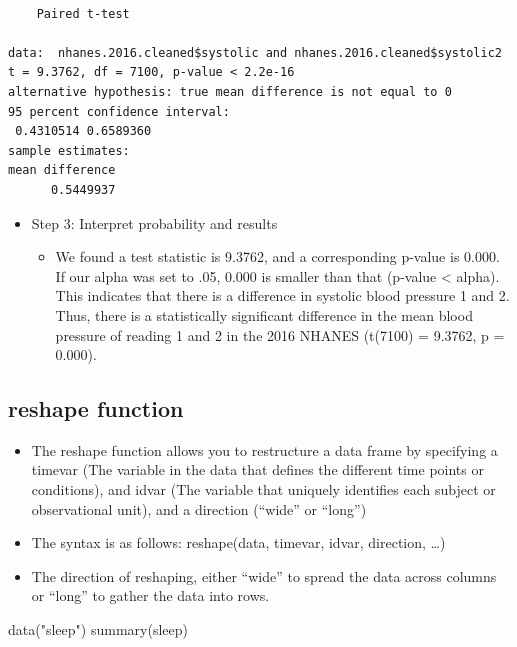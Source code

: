 \documentclass[
  letterpaper,
  DIV=11,
  numbers=noendperiod]{scrreprt}
\newenvironment{Shaded}{\begin{snugshade}}{\end{snugshade}}
\newcommand{\FunctionTok}[1]{\textcolor[rgb]{0.28,0.35,0.67}{#1}}
\newcommand{\NormalTok}[1]{\textcolor[rgb]{0.00,0.23,0.31}{#1}}
\newcommand{\StringTok}[1]{\textcolor[rgb]{0.13,0.47,0.30}{#1}}
\providecommand{\tightlist}{%
  \setlength{\itemsep}{0pt}\setlength{\parskip}{0pt}}\usepackage{longtable,booktabs,array}
\begin{document}
\begin{verbatim}

    Paired t-test

data:  nhanes.2016.cleaned$systolic and nhanes.2016.cleaned$systolic2
t = 9.3762, df = 7100, p-value < 2.2e-16
alternative hypothesis: true mean difference is not equal to 0
95 percent confidence interval:
 0.4310514 0.6589360
sample estimates:
mean difference 
      0.5449937 
\end{verbatim}

\begin{itemize}
\tightlist
\item
  Step 3: Interpret probability and results

  \begin{itemize}
  \tightlist
  \item
    We found a test statistic is 9.3762, and a corresponding p-value is
    0.000. If our alpha was set to .05, 0.000 is smaller than that
    (p-value \textless{} alpha). This indicates that there is a
    difference in systolic blood pressure 1 and 2. Thus, there is a
    statistically significant difference in the mean blood pressure of
    reading 1 and 2 in the 2016 NHANES (t(7100) = 9.3762, p = 0.000).
  \end{itemize}
\end{itemize}

\subsection{reshape function}\label{reshape-function}

\begin{itemize}
\tightlist
\item
  The reshape function allows you to restructure a data frame by
  specifying a timevar (The variable in the data that defines the
  different time points or conditions), and idvar (The variable that
  uniquely identifies each subject or observational unit), and a
  direction (``wide'' or ``long'')
\item
  The syntax is as follows: reshape(data, timevar, idvar, direction,
  \ldots)
\item
  The direction of reshaping, either ``wide'' to spread the data across
  columns or ``long'' to gather the data into rows.
\end{itemize}

\begin{Shaded}
\begin{Highlighting}[]
\FunctionTok{data}\NormalTok{(}\StringTok{"sleep"}\NormalTok{)}
\FunctionTok{summary}\NormalTok{(sleep)}
\end{Highlighting}
\end{Shaded}
\end{document}
